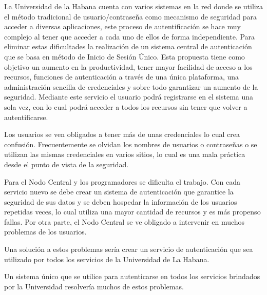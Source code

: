 La Universidad de la Habana cuenta con varios sistemas en la red donde se utiliza el método tradicional de usuario/contraseña como mecanismo de seguridad para acceder a diversas aplicaciones, este proceso de autentificación se hace muy complejo al tener que acceder a cada uno de ellos de forma independiente. Para eliminar estas dificultades la realización de un sistema central de autenticación que se basa en método de Inicio de Sesión Único. Esta propuesta tiene como objetivo un aumento en la productividad, tener mayor facilidad de acceso a los recursos, funciones de autenticación a través de una única plataforma, una administración sencilla de credenciales y sobre todo garantizar un aumento de la seguridad. Mediante este servicio el usuario podrá registrarse en el sistema una sola vez, con lo cual podrá acceder a todos los recursos sin tener que volver a autentificarse.


Los usuarios se ven obligados a tener más de unas credenciales lo cual crea confusión. Frecuentemente se olvidan los nombres de usuarios o contraseñas o se utilizan las mismas credenciales en varios sitios, lo cual es una mala práctica desde el punto de vista de la seguridad. 

Para el Nodo Central y los programadores se dificulta el trabajo. Con cada servicio nuevo se debe crear un sistema de autenticación que garantice la seguridad de sus datos y se deben hospedar la información de los usuarios repetidas veces, lo cual utiliza una mayor cantidad de recursos y es más propenso fallas. Por otra parte, el Nodo Central se ve obligado a intervenir en muchos problemas de los usuarios.

Una solución a estos problemas sería crear un servicio de autenticación que sea utilizado por todos los servicios de la Universidad de La Habana. 

Un sistema único que se utilice para autenticarse en todos los servicios brindados por la Universidad resolvería muchos de estos problemas. 


